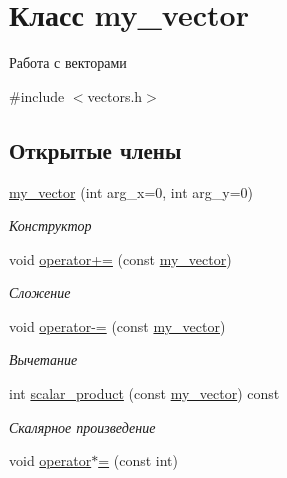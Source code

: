 \hypertarget{classmy__vector}{\section{Класс my\+\_\+vector}
\label{classmy__vector}
}


Работа с векторами  




{\ttfamily \#include $<$vectors.\+h$>$}

\subsection*{Открытые члены}
\begin{DoxyCompactItemize}
\item 
\hyperlink{classmy__vector_a1d74af67c8e3d7c98633eec28a9b0753}{my\+\_\+vector} (int arg\+\_\+x=0, int arg\+\_\+y=0)
\begin{DoxyCompactList}\small\item\em Конструктор \end{DoxyCompactList}\item 
void \hyperlink{classmy__vector_aaa6296ddc12be933ca4ef4f3701728fb}{operator+=} (const \hyperlink{classmy__vector}{my\+\_\+vector})
\begin{DoxyCompactList}\small\item\em Сложение \end{DoxyCompactList}\item 
void \hyperlink{classmy__vector_a2b7adbd3e478022dd436a95bc41fe0e2}{operator-\/=} (const \hyperlink{classmy__vector}{my\+\_\+vector})
\begin{DoxyCompactList}\small\item\em Вычетание \end{DoxyCompactList}\item 
int \hyperlink{classmy__vector_a6d09ad6011173ddc7252d8361281a7b9}{scalar\+\_\+product} (const \hyperlink{classmy__vector}{my\+\_\+vector}) const 
\begin{DoxyCompactList}\small\item\em Скалярное произведение \end{DoxyCompactList}\item 
\hypertarget{classmy__vector_a16bd51f078688bd0cb18b4f449ae211f}{void \hyperlink{classmy__vector_a16bd51f078688bd0cb18b4f449ae211f}{operator$\ast$=} (const int)}\label{classmy__vector_a16bd51f078688bd0cb18b4f449ae211f}


\end{DoxyCompactItemize}
